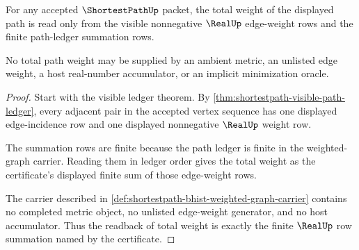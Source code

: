 \begin{theorem}
\label{thm:shortestpath-weight-readback}
For any accepted $\ShortestPathUp$ packet, the total weight of the displayed
path is read only from the visible nonnegative $\RealUp$ edge-weight rows and
the finite path-ledger summation rows.

No total path weight may be supplied by an ambient metric, an unlisted edge
weight, a host real-number accumulator, or an implicit minimization oracle.
\end{theorem}
\begin{proof}
Start with the visible ledger theorem. By
\autoref{thm:shortestpath-visible-path-ledger}, every adjacent pair in the
accepted vertex sequence has one displayed edge-incidence row and one
displayed nonnegative $\RealUp$ weight row.

The summation rows are finite because the path ledger is finite in the
weighted-graph carrier. Reading them in ledger order gives the total weight as
the certificate's displayed finite sum of those edge-weight rows.

The carrier described in
\autoref{def:shortestpath-bhist-weighted-graph-carrier} contains no completed
metric object, no unlisted edge-weight generator, and no host accumulator.
Thus the readback of total weight is exactly the finite $\RealUp$ row
summation named by the certificate.
\end{proof}

